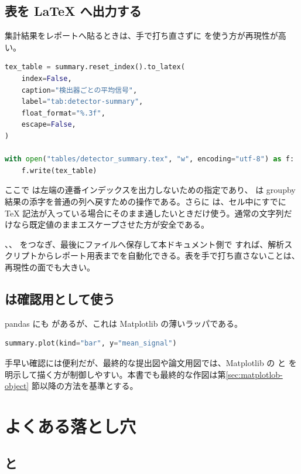\subsection{表を LaTeX へ出力する}

集計結果をレポートへ貼るときは、手で打ち直さずに  を使う方が再現性が高い。

\begin{lstlisting}[language=Python]
tex_table = summary.reset_index().to_latex(
    index=False,
    caption="検出器ごとの平均信号",
    label="tab:detector-summary",
    float_format="%.3f",
    escape=False,
)

with open("tables/detector_summary.tex", "w", encoding="utf-8") as f:
    f.write(tex_table)
\end{lstlisting}

ここで  は左端の連番インデックスを出力しないための指定であり、 は groupby 結果の添字を普通の列へ戻すための操作である。さらに  は、セル中にすでに TeX 記法が入っている場合にそのまま通したいときだけ使う。通常の文字列だけなら既定値のままエスケープさせた方が安全である。

、、 をつなぎ、最後にファイルへ保存して本ドキュメント側で \verb|| すれば、解析スクリプトからレポート用表までを自動化できる。表を手で打ち直さないことは、再現性の面でも大きい。

\subsection{ は確認用として使う}

pandas にも  があるが、これは Matplotlib の薄いラッパである。

\begin{lstlisting}[language=Python]
summary.plot(kind="bar", y="mean_signal")
\end{lstlisting}

手早い確認には便利だが、最終的な提出図や論文用図では、Matplotlib の  と  を明示して描く方が制御しやすい。本書でも最終的な作図は第\ref{sec:matplotlob-object} 節以降の方法を基準とする。

\section{よくある落とし穴}

\subsection{ と }

